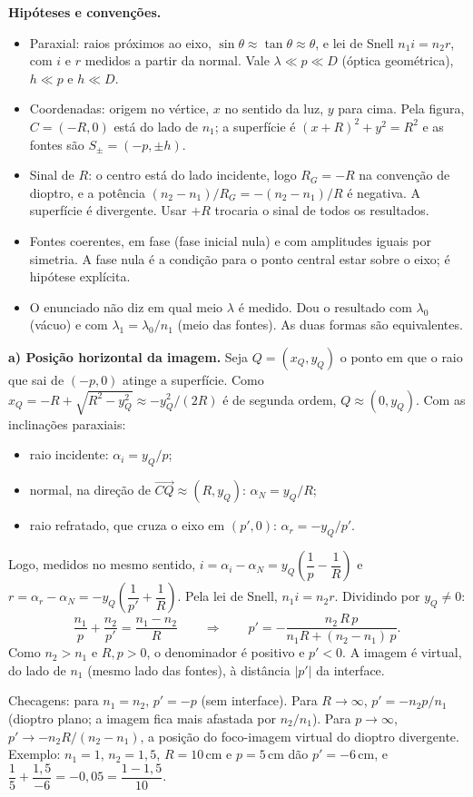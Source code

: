 \documentclass{article}%
\begin{document}
\textbf{Hipóteses e convenções.}
\begin{itemize}
\item Paraxial: raios próximos ao eixo, $\sin\theta\approx\tan\theta\approx\theta$, e lei de Snell $n_1 i=n_2 r$, com $i$ e $r$ medidos a partir da normal. Vale $\lambda\ll p\ll D$ (óptica geométrica), $h\ll p$ e $h\ll D$.
\item Coordenadas: origem no vértice, $x$ no sentido da luz, $y$ para cima. Pela figura, $C=(-R,0)$ está do lado de $n_1$; a superfície é $(x+R)^2+y^2=R^2$ e as fontes são $S_\pm=(-p,\pm h)$.
\item Sinal de $R$: o centro está do lado incidente, logo $R_G=-R$ na convenção de dioptro, e a potência $(n_2-n_1)/R_G=-(n_2-n_1)/R$ é negativa. A superfície é divergente. Usar $+R$ trocaria o sinal de todos os resultados.
\item Fontes coerentes, em fase (fase inicial nula) e com amplitudes iguais por simetria. A fase nula é a condição para o ponto central estar sobre o eixo; é hipótese explícita.
\item O enunciado não diz em qual meio $\lambda$ é medido. Dou o resultado com $\lambda_0$ (vácuo) e com $\lambda_1=\lambda_0/n_1$ (meio das fontes). As duas formas são equivalentes.
\end{itemize}

\textbf{a) Posição horizontal da imagem.} Seja $Q=(x_Q,y_Q)$ o ponto em que o raio que sai de $(-p,0)$ atinge a superfície. Como $x_Q=-R+\sqrt{R^2-y_Q^2}\approx -y_Q^2/(2R)$ é de segunda ordem, $Q\approx(0,y_Q)$. Com as inclinações paraxiais:
\begin{itemize}
\item raio incidente: $\alpha_i=y_Q/p$;
\item normal, na direção de $\overrightarrow{CQ}\approx(R,y_Q)$: $\alpha_N=y_Q/R$;
\item raio refratado, que cruza o eixo em $(p',0)$: $\alpha_r=-y_Q/p'$.
\end{itemize}
Logo, medidos no mesmo sentido, $i=\alpha_i-\alpha_N=y_Q\left(\dfrac1p-\dfrac1R\right)$ e $r=\alpha_r-\alpha_N=-y_Q\left(\dfrac1{p'}+\dfrac1R\right)$. Pela lei de Snell, $n_1 i=n_2 r$. Dividindo por $y_Q\neq0$:
\[
\frac{n_1}{p}+\frac{n_2}{p'}=\frac{n_1-n_2}{R}
\qquad\Rightarrow\qquad
p'=-\frac{n_2\,R\,p}{n_1R+(n_2-n_1)\,p}.
\]
Como $n_2>n_1$ e $R,p>0$, o denominador é positivo e $p'<0$. A imagem é virtual, do lado de $n_1$ (mesmo lado das fontes), à distância $|p'|$ da interface.

Checagens: para $n_1=n_2$, $p'=-p$ (sem interface). Para $R\to\infty$, $p'=-n_2p/n_1$ (dioptro plano; a imagem fica mais afastada por $n_2/n_1$). Para $p\to\infty$, $p'\to -n_2R/(n_2-n_1)$, a posição do foco-imagem virtual do dioptro divergente. Exemplo: $n_1=1$, $n_2=1{,}5$, $R=10\,\mathrm{cm}$ e $p=5\,\mathrm{cm}$ dão $p'=-6\,\mathrm{cm}$, e $\dfrac15+\dfrac{1{,}5}{-6}=-0{,}05=\dfrac{1-1{,}5}{10}$.
\end{document}
